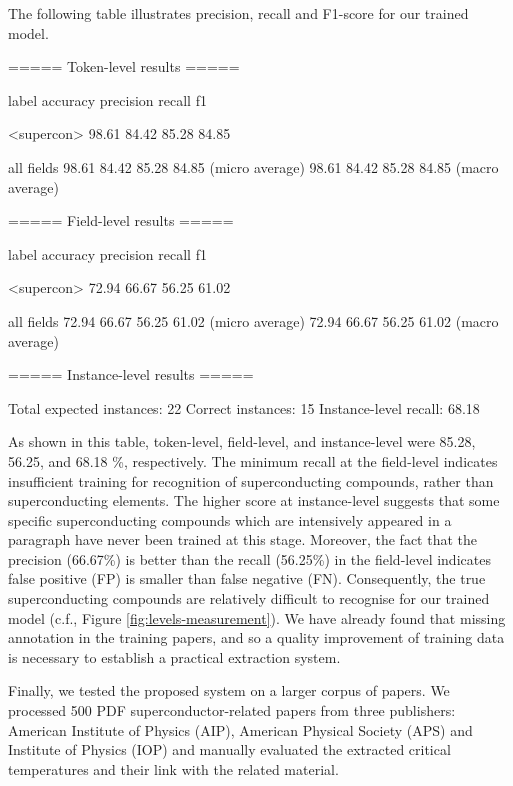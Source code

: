 \documentclass{article}[a4]
\begin{document}
The following table illustrates precision, recall and F1-score for our trained model.

\begin{verbnobox}[\small]
===== Token-level results =====

label                accuracy     precision    recall       f1     

<supercon>           98.61        84.42        85.28        84.85  

all fields           98.61        84.42        85.28        84.85   (micro average)
                     98.61        84.42        85.28        84.85   (macro average)

===== Field-level results =====

label                accuracy     precision    recall       f1     

<supercon>           72.94        66.67        56.25        61.02  

all fields           72.94        66.67        56.25        61.02   (micro average)
                     72.94        66.67        56.25        61.02   (macro average)

===== Instance-level results =====

Total expected instances:   22
Correct instances:          15
Instance-level recall:      68.18
\end{verbnobox}

As shown in this table, token-level, field-level, and instance-level were 85.28, 56.25, and 68.18 \%, respectively. The minimum recall at the field-level indicates insufficient training for recognition of superconducting compounds, rather than superconducting elements. The higher score at instance-level suggests that some specific superconducting compounds which are intensively appeared in a paragraph have never been trained at this stage. Moreover, the fact that the precision (66.67\%) is better than the recall (56.25\%) in the field-level indicates false positive (FP) is smaller than false negative (FN). Consequently, the true superconducting compounds are relatively difficult to recognise for our trained model (c.f., Figure \ref{fig:levels-measurement}). We have already found that missing annotation in the training papers, and so a quality improvement of training data is necessary to establish a practical extraction system.

Finally, we tested the proposed system on a larger corpus of papers. We processed 500 PDF superconductor-related papers from three publishers: American Institute of Physics (AIP), American Physical Society (APS) and Institute of Physics (IOP) and manually evaluated the extracted critical temperatures and their link with the related material. 
\end{document}
